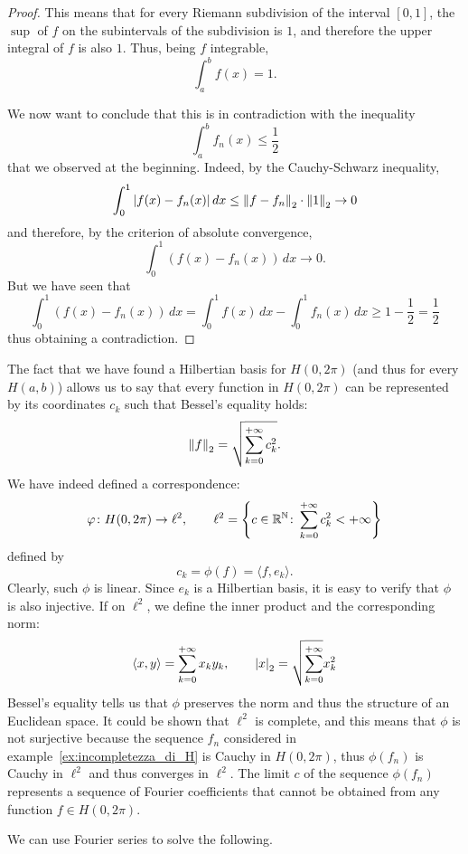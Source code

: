 \begin{proof}
This means that for every Riemann subdivision of the interval $[0,1]$, the
$\sup$ of $f$ on the subintervals of the subdivision is $1$, and therefore the
upper integral of $f$ is also $1$. Thus, being $f$ integrable,
\[
  \int_a^b f(x) = 1.
\]

We now want to conclude that this is in contradiction with the inequality
\[
  \int_a^b f_n(x) \le \frac 1 2
\]
that we observed at the beginning. Indeed, by the Cauchy-Schwarz inequality,
\begin{align*}
  \int_0^1 {\left|f(x)-f_n(x)\right|}\, dx
  \le {\left\Vert f-f_n\right\Vert}_2\cdot {\left\Vert 1\right\Vert}_2  \to 0
\end{align*}
and therefore, by the criterion of absolute convergence,
\[
  \int_0^1 (f(x) - f_n(x))\, dx \to 0.
\]
But we have seen that
\[
  \int_0^1 (f(x) - f_n(x))\, dx
  = \int_0^1 f(x)\, dx - \int_0^1 f_n(x)\, dx
  \ge 1 - \frac 1 2 = \frac 1 2
\]
thus obtaining a contradiction.
\end{proof}

The fact that we have found a Hilbertian basis for $H(0,2\pi)$ (and thus for
every $H(a,b)$) allows us to say that every function in $H(0,2\pi)$ can be
represented by its coordinates $c_k$ such that Bessel's equality holds:
\[
  {\left\Vert f\right\Vert}_2 = \sqrt{\sum_{k=0}^{+\infty} c_k^2}.
\]
We have indeed defined a correspondence:
\[
  \varphi \colon H(0,2\pi) \to \ell^2,
  \qquad
  \ell^2={\left\{ c\in {\mathbb R}^{\mathbb N} \colon \sum_{k=0}^{+\infty} c_k^2<+\infty \right\}}
\]
defined by
\[
  c_k = \phi(f) = \langle f, e_k\rangle.
\]
Clearly, such $\phi$ is linear. Since $e_k$ is a Hilbertian basis, it is easy to
verify that $\phi$ is also injective. If on $\ell^2$, we define the inner
product and the corresponding norm:
\[
  \langle x,y\rangle = \sum_{k=0}^{+\infty} x_k y_k, \qquad
  {\left|x\right|}_2 = \sqrt{\sum_{k=0}^{+\infty}} x_k^2
\]
Bessel's equality tells us that $\phi$ preserves the norm and thus the structure
of an Euclidean space. It could be shown that $\ell^2$ is complete, and this
means that $\phi$ is not surjective because the sequence $f_n$ considered in
example~\ref{ex:incompletezza_di_H} is Cauchy in $H(0,2\pi)$, thus $\phi(f_n)$
is Cauchy in $\ell^2$ and thus converges in $\ell^2$. The limit $c$ of the
sequence $\phi(f_n)$ represents a sequence of Fourier coefficients that cannot
be obtained from any function $f\in H(0,2\pi)$.

We can use Fourier series to solve the following.

